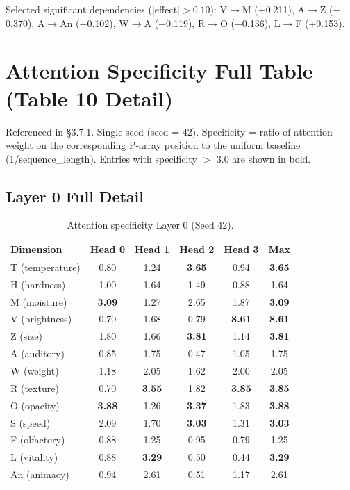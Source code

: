 \documentclass{article}
\begin{document}
Selected significant dependencies ($|$effect$| > 0.10$): V$\rightarrow$M (+0.211), A$\rightarrow$Z ($-$0.370), A$\rightarrow$An ($-$0.102), W$\rightarrow$A (+0.119), R$\rightarrow$O ($-$0.136), L$\rightarrow$F (+0.153).

\section{Attention Specificity Full Table (Table 10 Detail)}

Referenced in \S3.7.1. Single seed (seed = 42). Specificity = ratio of attention weight on the corresponding P-array position to the uniform baseline (1/sequence\_length). Entries with specificity $>$ 3.0 are shown in bold.

\subsection{Layer 0 Full Detail}

\begin{table}[htbp]
\centering
\small
\caption{Attention specificity Layer 0 (Seed 42).}
\label{tab:attention_l0}
\begin{tabular}{lccccc}
\toprule
Dimension & Head 0 & Head 1 & Head 2 & Head 3 & Max \\
\midrule
T (temperature) & 0.80 & 1.24 & \textbf{3.65} & 0.94 & \textbf{3.65} \\
H (hardness) & 1.00 & 1.64 & 1.49 & 0.88 & 1.64 \\
M (moisture) & \textbf{3.09} & 1.27 & 2.65 & 1.87 & \textbf{3.09} \\
V (brightness) & 0.70 & 1.68 & 0.79 & \textbf{8.61} & \textbf{8.61} \\
Z (size) & 1.80 & 1.66 & \textbf{3.81} & 1.14 & \textbf{3.81} \\
A (auditory) & 0.85 & 1.75 & 0.47 & 1.05 & 1.75 \\
W (weight) & 1.18 & 2.05 & 1.62 & 2.00 & 2.05 \\
R (texture) & 0.70 & \textbf{3.55} & 1.82 & \textbf{3.85} & \textbf{3.85} \\
O (opacity) & \textbf{3.88} & 1.26 & \textbf{3.37} & 1.83 & \textbf{3.88} \\
S (speed) & 2.09 & 1.70 & \textbf{3.03} & 1.31 & \textbf{3.03} \\
F (olfactory) & 0.88 & 1.25 & 0.95 & 0.79 & 1.25 \\
L (vitality) & 0.88 & \textbf{3.29} & 0.50 & 0.44 & \textbf{3.29} \\
An (animacy) & 0.94 & 2.61 & 0.51 & 1.17 & 2.61 \\
\bottomrule
\end{tabular}
\end{table}
\end{document}
